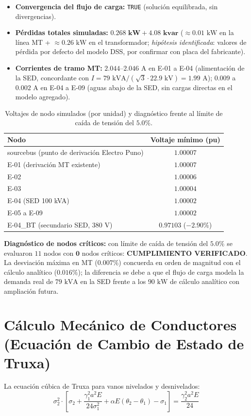 \documentclass[12pt,a4paper]{report}
\begin{document}
\begin{itemize}
    \item \textbf{Convergencia del flujo de carga:} \texttt{TRUE} (solución equilibrada, sin divergencias).
    \item \textbf{Pérdidas totales simuladas:} $\mathbf{0.268\text{ kW}} + \mathbf{4.08\text{ kvar}}$ ($\approx 0.01\text{ kW}$ en la línea MT + $\approx 0.26\text{ kW}$ en el transformador; \emph{hipótesis identificada}: valores de pérdida por defecto del modelo DSS, por confirmar con placa del fabricante).
    \item \textbf{Corrientes de tramo MT:} $2.044$–$2.046\text{ A}$ en E-01 a E-04 (alimentación de la SED, concordante con $I = 79\text{ kVA}/(\sqrt{3} \cdot 22.9\text{ kV}) = 1.99\text{ A}$); $0.009$ a $0.002\text{ A}$ en E-04 a E-09 (aguas abajo de la SED, sin cargas directas en el modelo agregado).
\end{itemize}

\begin{table}[h]
\centering
\caption{Voltajes de nodo simulados (por unidad) y diagnóstico frente al límite de caída de tensión del $5.0\%$.}
\begin{tabular}{@{}lc@{}}
\toprule
\textbf{Nodo} & \textbf{Voltaje mínimo (pu)} \\
\midrule
sourcebus (punto de derivación Electro Puno) & $1.00007$ \\
E-01 (derivación MT existente) & $1.00007$ \\
E-02 & $1.00006$ \\
E-03 & $1.00004$ \\
E-04 (SED 100 kVA) & $1.00002$ \\
E-05 a E-09 & $1.00002$ \\
E-04\_BT (secundario SED, $380\text{ V}$) & $0.97103$ ($-2.90\%$) \\
\bottomrule
\end{tabular}
\end{table}

\textbf{Diagnóstico de nodos críticos:} con límite de caída de tensión del $5.0\%$ se evaluaron $11$ nodos con $\mathbf{0}$ nodos críticos: \textbf{CUMPLIMIENTO VERIFICADO}. La desviación máxima en MT ($0.007\%$) concuerda en orden de magnitud con el cálculo analítico ($0.016\%$); la diferencia se debe a que el flujo de carga modela la demanda real de $79\text{ kVA}$ en la SED frente a los $90\text{ kW}$ de cálculo analítico con ampliación futura.

\section{Cálculo Mecánico de Conductores (Ecuación de Cambio de Estado de Truxa)}
La ecuación cúbica de Truxa para vanos nivelados y desnivelados:
\begin{equation}
    \sigma_2^2 \cdot \left[ \sigma_2 + \frac{\gamma_1^2 a^2 E}{24 \sigma_1^2} + \alpha E (\theta_2 - \theta_1) - \sigma_1 \right] = \frac{\gamma_2^2 a^2 E}{24}
\end{equation}
\end{document}
